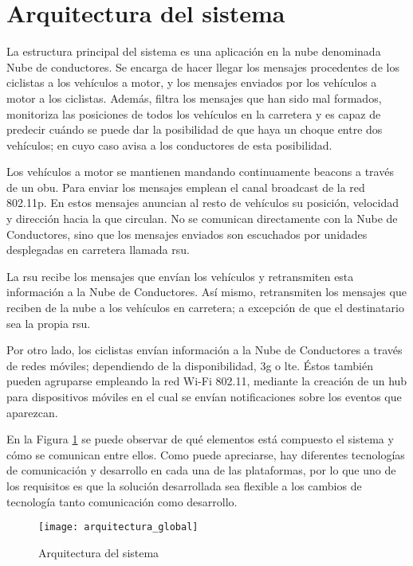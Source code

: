\section{Arquitectura del sistema}\label{section:arquitecturaSistema}
La estructura principal del sistema es una aplicación en la nube denominada
Nube de conductores. Se encarga de hacer llegar los mensajes procedentes de
los ciclistas a los vehículos a motor, y los mensajes enviados por los
vehículos a motor a los ciclistas. Además, filtra los mensajes que han sido
mal formados, monitoriza las posiciones de todos los vehículos en la carretera
y es capaz de predecir cuándo se puede dar la posibilidad de que haya un choque
entre dos vehículos; en cuyo caso avisa a los conductores de esta posibilidad.

Los vehículos a motor se mantienen mandando continuamente beacons a través
de un \gls{obu}. Para enviar los mensajes emplean el canal broadcast de la
red \Gls{802.11p}. En estos mensajes anuncian al resto de vehículos su
posición, velocidad y dirección hacia la que circulan. No se comunican
directamente con la Nube de Conductores, sino que los mensajes enviados
son escuchados por unidades desplegadas en carretera llamada \gls{rsu}.

La \gls{rsu} recibe los mensajes que envían los vehículos y retransmiten esta
información a la Nube de Conductores. Así mismo, retransmiten los mensajes que
reciben de la nube a los vehículos en carretera; a excepción de que el
destinatario sea la propia \gls{rsu}.

Por otro lado, los ciclistas envían información a la Nube de Conductores a
través de redes móviles; dependiendo de la disponibilidad, \gls{3g} o \gls{lte}.
Éstos también pueden agruparse empleando la red Wi-Fi 802.11, mediante la
creación de un hub para dispositivos móviles en el cual se envían
notificaciones sobre los eventos que aparezcan.

En la Figura \ref{fig:ArquitecturaSistema} se puede observar de qué elementos
está compuesto el sistema y cómo se comunican entre ellos. Como puede
apreciarse, hay diferentes tecnologías de comunicación y desarrollo en cada
una de las plataformas, por lo que uno de los requisitos es que la solución
desarrollada sea flexible a los cambios de tecnología tanto comunicación como
desarrollo.

\begin{figure}[H]
	\begin{center}
		\texttt{[image: arquitectura\_global]}
		\caption{Arquitectura del sistema}
		\label{fig:ArquitecturaSistema}
	 \end{center}
\end{figure}



